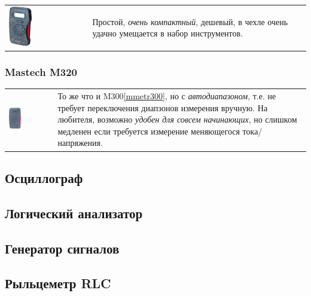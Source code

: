 \begin{tabular}{p{} p{}}
\noindent\includegraphics[width=0.3\textwidth]{tech/tools/mes/M300.jpg}
&
Простой, \emph{очень компактный}, дешевый, в чехле очень удачно умещается в
набор инструментов.
\\
\end{tabular}

\subsubsection{Mastech M320}\label{mmetr320}

\begin{tabular}{p{} p{}}
\noindent\includegraphics[width=0.3\textwidth]{tech/tools/mes/M320.jpg}
&
То же что и M300\ref{mmetr300}, но с \emph{автодиапазоном}, т.е. не требует
переключения диапзонов измерения вручную. На любителя, возможно \emph{удобен для
совсем начинающих}, но слишком медленен если требуется измерение меняющегося
тока/напряжения.
\\
\end{tabular}

\subsection{Осциллограф}

\subsection{Логический анализатор}

\subsection{Генератор сигналов}

\subsection{Рыльцеметр RLC}\label{rlcmetr}


